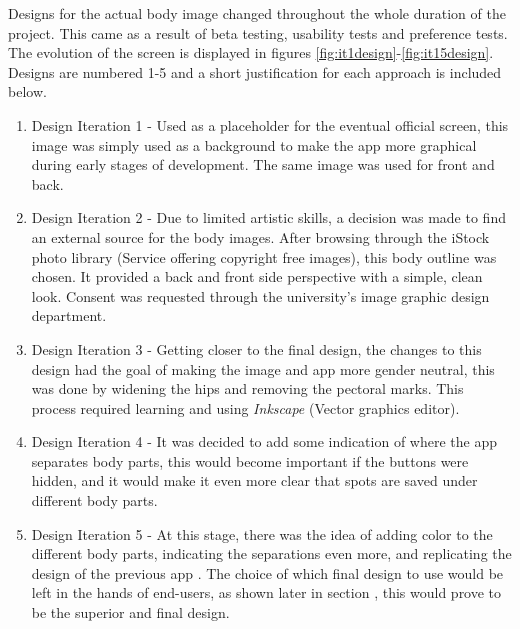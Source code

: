 Designs for the actual body image changed throughout the whole duration of the project. This came as a result of beta testing, usability tests and preference tests. The evolution of the screen is displayed in figures \ref{fig:it1design}-\ref{fig:it15design}. Designs are numbered 1-5 and a short justification for each approach is included below.
\begin{enumerate}
    \item Design Iteration 1 - Used as a placeholder for the eventual official screen, this image was simply used as a background to make the app more graphical during early stages of development. The same image was used for front and back.
    \item Design Iteration 2 - Due to limited artistic skills, a decision was made to find an external source for the body images. After browsing through the iStock photo library (Service offering copyright free images), this body outline was chosen. It provided a back and front side perspective with a simple, clean look. Consent was requested through the university's image graphic design department.
    \item Design Iteration 3 - Getting closer to the final design, the changes to this design had the goal of making the image and app more gender neutral, this was done by widening the hips and removing the pectoral marks. This process required learning and using \emph{Inkscape} (Vector graphics editor).
    \item Design Iteration 4 - It was decided to add some indication of where the app separates body parts, this would become important if the buttons were hidden, and it would make it even more clear that spots are saved under different body parts.
    \item Design Iteration 5 - At this stage, there was the idea of adding color to the different body parts, indicating the separations even more, and replicating the design of the previous app . The choice of which final design to use would be left in the hands of end-users, as shown later in section , this would prove to be the superior and final design.
\end{enumerate}

